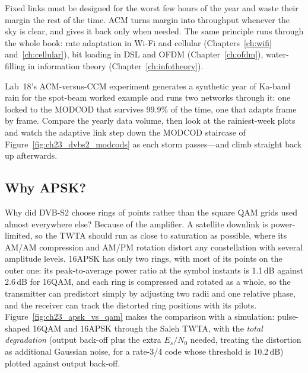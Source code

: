 \begin{keyidea}
Fixed links must be designed for the worst few hours of the year and waste their margin the rest
of the time. ACM turns margin into throughput whenever the sky is clear, and gives it back only
when needed. The same principle runs through the whole book: rate adaptation in Wi-Fi and
cellular (Chapters~\ref{ch:wifi} and~\ref{ch:cellular}), bit loading in DSL and OFDM
(Chapter~\ref{ch:ofdm}), water-filling in information theory (Chapter~\ref{ch:infotheory}).
\end{keyidea}

\begin{tryit}
Lab~18's ACM-versus-CCM experiment generates a synthetic year of Ka-band rain for the spot-beam
worked example and runs two networks through it: one locked to the MODCOD that survives 99.9\% of
the time, one that adapts frame by frame. Compare the yearly data volume, then look at the
rainiest-week plots and watch the adaptive link step down the MODCOD staircase of
Figure~\ref{fig:ch23_dvbs2_modcods} as each storm passes---and climb straight back up afterwards.
\end{tryit}

\subsection{Why APSK?}

Why did DVB-S2 choose rings of points rather than the square QAM grids used almost everywhere
else? Because of the amplifier. A satellite downlink is power-limited, so the TWTA should run as
close to saturation as possible, where its AM/AM compression and AM/PM rotation distort any
constellation with several amplitude levels. 16APSK has only two rings, with most of its points on
the outer one: its peak-to-average power ratio at the symbol instants is 1.1\,dB against 2.6\,dB
for 16QAM, and each ring is compressed and rotated as a whole, so the transmitter can predistort
simply by adjusting two radii and one relative phase, and the receiver can track the distorted
ring positions with its pilots. Figure~\ref{fig:ch23_apsk_vs_qam} makes the comparison with a
simulation: pulse-shaped 16QAM and 16APSK through the Saleh TWTA, with the \emph{total degradation}
(output back-off plus the extra $E_s/N_0$ needed, treating the distortion as additional Gaussian
noise, for a rate-3/4 code whose threshold is 10.2\,dB) plotted against output back-off.

